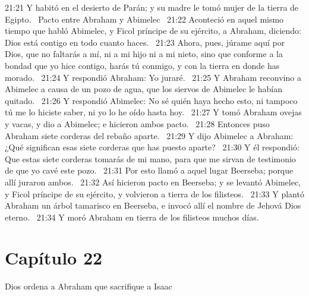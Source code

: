 21:21 Y habitó en el desierto de Parán; y su madre le tomó mujer de la tierra de Egipto.  
Pacto entre Abraham y Abimelec  
21:22 Aconteció en aquel mismo tiempo que habló Abimelec, y Ficol príncipe de su ejército, a Abraham, diciendo: Dios está contigo en todo cuanto haces.  
21:23 Ahora, pues, júrame aquí por Dios, que no faltarás a mí, ni a mi hijo ni a mi nieto, sino que conforme a la bondad que yo hice contigo, harás tú conmigo, y con la tierra en donde has morado.  
21:24 Y respondió Abraham: Yo juraré.  
21:25 Y Abraham reconvino a Abimelec a causa de un pozo de agua, que los siervos de Abimelec le habían quitado.  
21:26 Y respondió Abimelec: No sé quién haya hecho esto, ni tampoco tú me lo hiciste saber, ni yo lo he oído hasta hoy.  
21:27 Y tomó Abraham ovejas y vacas, y dio a Abimelec; e hicieron ambos pacto.  
21:28 Entonces puso Abraham siete corderas del rebaño aparte.  
21:29 Y dijo Abimelec a Abraham: ¿Qué significan esas siete corderas que has puesto aparte?  
21:30 Y él respondió: Que estas siete corderas tomarás de mi mano, para que me sirvan de testimonio de que yo cavé este pozo.  
21:31 Por esto llamó a aquel lugar Beerseba; porque allí juraron ambos.  
21:32 Así hicieron pacto en Beerseba; y se levantó Abimelec, y Ficol príncipe de su ejército, y volvieron a tierra de los filisteos.  
21:33 Y plantó Abraham un árbol tamarisco en Beerseba, e invocó allí el nombre de Jehová Dios eterno.  
21:34 Y moró Abraham en tierra de los filisteos muchos días.  
\section*{Capítulo 22}
Dios ordena a Abraham que sacrifique a Isaac  

